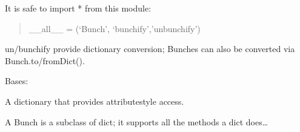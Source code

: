 \documentclass[letterpaper,10pt,english]{sphinxmanual}
\begin{document}
\sphinxAtStartPar
It is safe to import * from this module:
\begin{quote}

\sphinxAtStartPar
\_\_all\_\_ = (‘Bunch’, ‘bunchify’,’unbunchify’)
\end{quote}

\sphinxAtStartPar
un/bunchify provide dictionary conversion; Bunches can also be
converted via Bunch.to/fromDict().

\begin{fulllineitems}
\label{\detokenize{classes:classes.pyBunch.Bunch}}
\pysigstartsignatures
{}
\pysigstopsignatures
\sphinxAtStartPar
Bases: 

\sphinxAtStartPar
A dictionary that provides attribute\sphinxhyphen{}style access.

\begin{sphinxVerbatim}[commandchars=\\\{\}]
  
  
\PYG{p}{[}\PYG{p}{]}  
  
  \PYG{p}{[}\PYG{p}{]}
\end{sphinxVerbatim}

\sphinxAtStartPar
A Bunch is a subclass of dict; it supports all the methods a dict does…


\end{fulllineitems}
\end{document}
